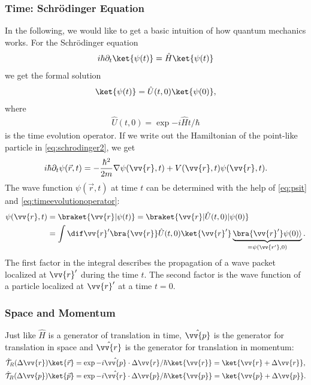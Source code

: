 
	\subsubsection{Time: Schrödinger Equation}
	In the following, we would like to get a basic intuition of how quantum mechanics works. For the Schrödinger equation
	\begin{align}
	i\hbar \partial_t\ket{\psi(t)} = \hat{H}\ket{\psi(t)} \label{eq:schrodinger2}
	\end{align}
	we get the formal solution
			\begin{align}
				\ket{\psi(t)}=\hat{U}(t,0)\ket{\psi(0)}, \label{eq:psit}
			\end{align}
			where
			\begin{align}
				\hat{U}(t,0) = \exp{-i{\hat{H}t}/{\hbar}} \label{eq:timeevolutionoperator}
			\end{align}
	is the time evolution operator. If we write out the Hamiltonian of the point-like particle in \eqref{eq:schrodinger2}, we get
	\begin{align}
		i\hbar \partial_t\psi(\vec{r},t) = -\frac{\hbar^2}{2m}\nabla\psi(\vv{r},t)+V(\vv{r},t)\psi(\vv{r},t).
	\end{align}
The wave function $\psi(\vec{r},t)$ at time $t$ can be determined with the help of \eqref{eq:psit} and \eqref{eq:timeevolutionoperator}:
			\begin{align}
				\psi(\vv{r},t)	&=\braket{\vv{r}|\psi(t)}=\braket{\vv{r}|\hat{U}(t,0)|\psi(0)}\\
				&=\int\dif\vv{r}'\bra{\vv{r}}\hat{U}(t,0)\ket{\vv{r}'}\underbrace{\bra{\vv{r}'}\psi(0)\rangle}_{=\psi(\vv{r'}, 0)}.
			\end{align}
The first factor in the integral describes the propagation of a wave packet localized at $\vv{r}'$ during the time $t$. The second factor is the wave function of a particle localized at $\vv{r}'$ at a time $t=0$. %

\subsubsection{Space and Momentum}

Just like $\hat{H}$ is a generator of translation in time, $\hat{\vv{p}}$ is the generator for translation in space and $\hat{\vv{r}}$ is the generator for translation in momentum:
				\begin{align}
					\hat{\mathcal{T}}_R(\Delta{\vv{r}}) \ket{\vec{r}} &= \exp{-i\hat{\vv{p}}\cdot{\Delta\vv{r}}/{\hbar}}\ket{\vv{r}}=\ket{\vv{r}+\Delta\vv{r}},\\
					\hat{\mathcal{T}}_R(\Delta{\vv{p}}) \ket{\vec{p}} &= \exp{-i\hat{\vv{r}}\cdot{\Delta\vv{p}}/{\hbar}}\ket{\vv{p}}=\ket{\vv{p}+\Delta\vv{p}}.
				\end{align}